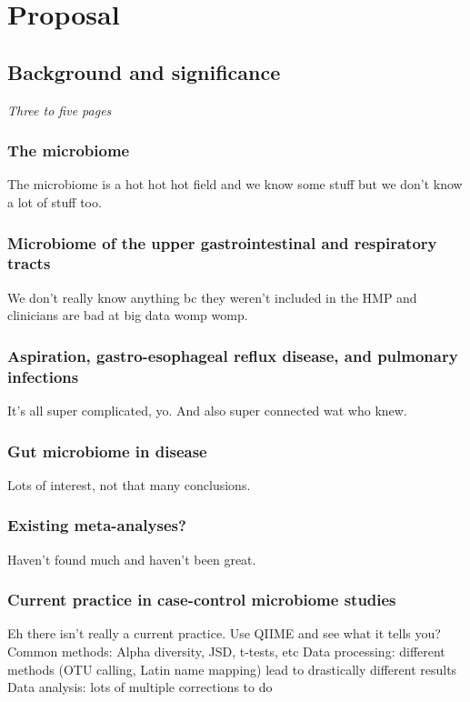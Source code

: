 \documentclass[12pt]{report}
\begin{document}
\chapter*{Proposal}
\section*{Background and significance}
\textit{Three to five pages}

\subsection*{The microbiome}
The microbiome is a hot hot hot field and we know some stuff but we don't know a lot of stuff too.

\subsection*{Microbiome of the upper gastrointestinal and respiratory tracts}
We don't really know anything bc they weren't included in the HMP and clinicians are bad at big data womp womp.

\subsection*{Aspiration, gastro-esophageal reflux disease, and pulmonary infections}
It's all super complicated, yo. And also super connected wat who knew.

\subsection*{Gut microbiome in disease}
Lots of interest, not that many conclusions.

\subsection*{Existing meta-analyses?}
Haven't found much and haven't been great.

\subsection*{Current practice in case-control microbiome studies}
Eh there isn't really a current practice. Use QIIME and see what it tells you?
Common methods: Alpha diversity, JSD, t-tests, etc
Data processing: different methods (OTU calling, Latin name mapping) lead to drastically different results
Data analysis: lots of multiple corrections to do
\end{document}
